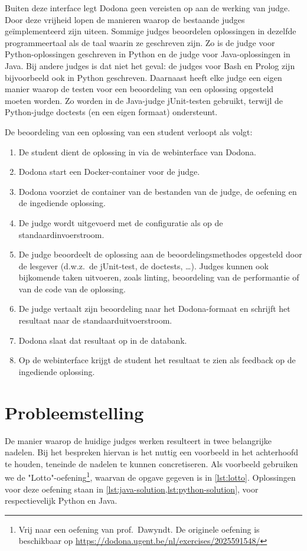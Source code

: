 Buiten deze interface legt Dodona geen vereisten op aan de werking van judge.
Door deze vrijheid lopen de manieren waarop de bestaande judges geïmplementeerd zijn uiteen.
Sommige judges beoordelen oplossingen in dezelfde programmeertaal als de taal waarin ze geschreven zijn.
Zo is de judge voor Python-oplossingen geschreven in Python en de judge voor Java-oplossingen in Java.
Bij andere judges is dat niet het geval: de judges voor Bash en Prolog zijn bijvoorbeeld ook in Python geschreven.
Daarnaast heeft elke judge een eigen manier waarop de testen voor een beoordeling van een oplossing opgesteld moeten worden.
Zo worden in de Java-judge jUnit-testen gebruikt, terwijl de Python-judge doctests (en een eigen formaat) ondersteunt.

De beoordeling van een oplossing van een student verloopt als volgt:

\begin{enumerate}
    \item De student dient de oplossing in via de webinterface van Dodona.
    \item Dodona start een Docker-container voor de judge.
    \item Dodona voorziet de container van de bestanden van de judge, de oefening en de ingediende oplossing.
    \item De judge wordt uitgevoerd met de configuratie als op de standaardinvoerstroom.
    \item De judge beoordeelt de oplossing aan de beoordelingsmethodes opgesteld door de lesgever (d.w.z.\ de jUnit-test, de doctests, \ldots).
    Judges kunnen ook bijkomende taken uitvoeren, zoals linting, beoordeling van de performantie of  van de code van de oplossing.
    \item De judge vertaalt zijn beoordeling naar het Dodona-formaat en schrijft het resultaat naar de standaarduitvoerstroom.
    \item Dodona slaat dat resultaat op in de databank.
    \item Op de webinterface krijgt de student het resultaat te zien als feedback op de ingediende oplossing.
\end{enumerate}

\section{Probleemstelling}\label{sec:probleemstelling}

De manier waarop de huidige judges werken resulteert in twee belangrijke nadelen.
Bij het bespreken hiervan is het nuttig een voorbeeld in het achterhoofd te houden, teneinde de nadelen te kunnen concretiseren.
Als voorbeeld gebruiken we de "Lotto"-oefening\footnote{Vrij naar een oefening van prof.\ Dawyndt.
De originele oefening is beschikbaar op \url{https://dodona.ugent.be/nl/exercises/2025591548/}}, waarvan de opgave gegeven is in \cref{lst:lotto}.
Oplossingen voor deze oefening staan in \cref{lst:java-solution,lst:python-solution}, voor respectievelijk Python en Java.

